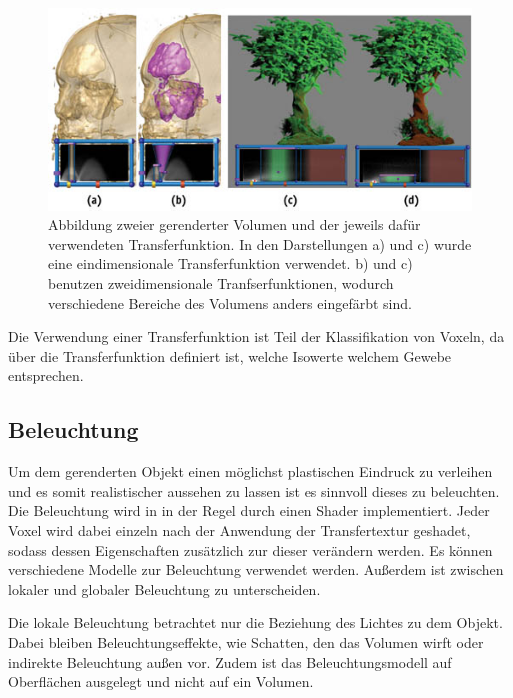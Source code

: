\begin{figure}
	\centering
	\includegraphics[width=0.7\linewidth]{images/transferfunction.jpg}
	\caption{Abbildung zweier gerenderter Volumen und der jeweils dafür verwendeten Transferfunktion. In den Darstellungen a) und c) wurde eine eindimensionale Transferfunktion verwendet. b) und c) benutzen zweidimensionale Tranfserfunktionen, wodurch verschiedene Bereiche des Volumens anders eingefärbt sind. }
	\label{img:phong}
\end{figure}

Die Verwendung einer Transferfunktion ist Teil der Klassifikation von Voxeln, da über die Transferfunktion definiert ist, welche Isowerte welchem Gewebe entsprechen.

\subsection{Beleuchtung}
\label{beleuchtung}

Um dem gerenderten Objekt einen möglichst plastischen Eindruck zu verleihen und es somit realistischer aussehen zu lassen ist es sinnvoll dieses zu beleuchten. 
Die Beleuchtung wird in in der Regel durch einen Shader implementiert. Jeder Voxel wird dabei einzeln nach der Anwendung der Transfertextur geshadet, sodass dessen Eigenschaften zusätzlich zur dieser verändern werden. Es können verschiedene Modelle zur Beleuchtung verwendet werden. Außerdem ist zwischen lokaler und globaler Beleuchtung zu unterscheiden.


Die lokale Beleuchtung betrachtet nur die Beziehung des Lichtes zu dem Objekt. Dabei bleiben Beleuchtungseffekte, wie Schatten, den das Volumen wirft oder indirekte Beleuchtung außen vor. Zudem ist das Beleuchtungsmodell auf Oberflächen ausgelegt und nicht auf ein Volumen. 

